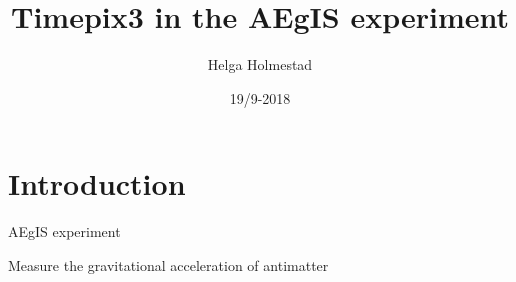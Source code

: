 \documentclass{beamer}
\title[]{Timepix3 in the AEgIS experiment}
\author{Helga Holmestad}
\institute{University of Oslo}
\date{19/9-2018}
\begin{document}
\begin{frame}
  \titlepage
\end{frame}


\section{Introduction}

\begin{frame}{\centering AEgIS experiment}
  \vspace{0.5cm}
  \begin{center}
  Measure the gravitational acceleration of antimatter
      

\end{center}
\end{frame}
\end{document}
